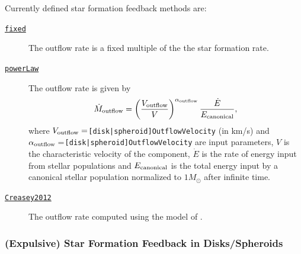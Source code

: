 Currently defined star formation feedback methods are:
\begin{description}
 \item [\hyperlink{star_formation.feedback.disks.fixed.F90:star_formation_feedback_disks_fixed}{{\tt fixed}}] The outflow rate is a fixed multiple of the the star formation rate.
 \item [\hyperlink{star_formation.feedback.spheroids.power_law.F90:star_formation_feedback_spheroids_power_law:star_formation_feedback_spheroid_outflow_rate_power_law}{{\tt powerLaw}}] The outflow rate is given by
\begin{equation}
 \dot{M}_{\rm outflow} = \left({V_{\rm outflow} \over V}\right)^{\alpha_{\rm outflow}} {\dot{E} \over E_{\rm canonical}},
\end{equation}
where $V_{\rm outflow}=${\tt [disk|spheroid]OutflowVelocity} (in km/s) and $\alpha_{\rm outflow}=${\tt [disk|spheroid]OutflowVelocity} are input parameters, $V$ is the characteristic velocity of the component, $\dot{E}$ is the rate of energy input from stellar populations and $E_{\rm canonical}$ is the total energy input by a canonical stellar population normalized to $1 M_\odot$ after infinite time.
 \item [\hyperlink{star_formation.feedback.disks.Creasey2012.F90:star_formation_feedback_disks_creasey2012}{{\tt Creasey2012}}] The outflow rate computed using the model of \cite{creasey_how_2012}.
\end{description}

\subsubsection{(Expulsive) Star Formation Feedback in Disks/Spheroids}

